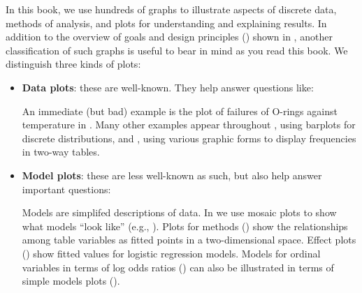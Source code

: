 
In this book, we use hundreds of graphs to illustrate aspects of discrete data,
methods of analysis, and plots for understanding and explaining results.
In addition to the overview of goals and design principles ()
shown in , another classification of such graphs is
useful to bear in mind as you read this book.  We distinguish three kinds of plots:

\begin{itemize}
    \item \textbf{Data plots}: these are well-known. They help answer questions like:

    An immediate (but bad) example is the plot of failures of O-rings against temperature
    in . Many other examples appear throughout ,
    using barplots for discrete distributions, and , using various graphic forms
    to display frequencies in two-way tables.

    \item \textbf{Model plots}: these are less well-known as such, but also help answer important questions:

    Models are simplifed descriptions of data.  In  we use mosaic
    plots to show what \loglin models ``look like'' (e.g., ).
    Plots for \ca methods () show the relationships among table variables
    as fitted points in a two-dimensional space.
    Effect plots () show fitted values for logistic regression models.
    Models for ordinal variables in terms of log odds ratios ()
    can also be illustrated in terms of simple models plots ().


\end{itemize}
